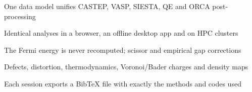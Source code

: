 \item One data model unifies CASTEP, VASP, SIESTA, QE and ORCA post-processing
\item Identical analyses in a browser, an offline desktop app and on HPC clusters
\item The Fermi energy is never recomputed; scissor and empirical gap corrections
\item Defects, distortion, thermodynamics, Voronoi/Bader charges and density maps
\item Each session exports a BibTeX file with exactly the methods and codes used
